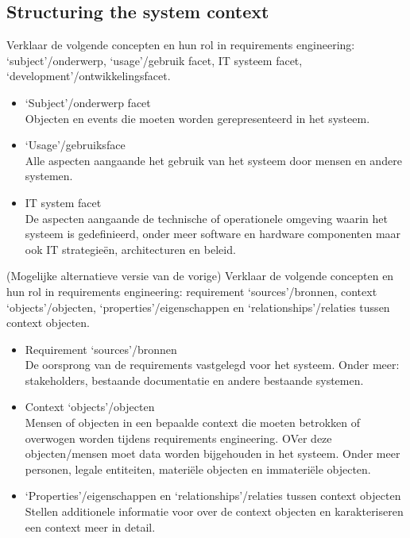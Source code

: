 \documentclass{article}
\begin{document}
\subsection{Structuring the system context}

\begin{quest}{}Verklaar de volgende concepten en hun rol in requirements engineering: `subject'/onderwerp, `usage'/gebruik facet, IT systeem facet, `development'/ontwikkelingsfacet.
\end{quest}

\begin{itemize}
    \item `Subject'/onderwerp facet\\
    Objecten en events die moeten worden gerepresenteerd in het systeem.
    \item `Usage'/gebruiksface\\
    Alle aspecten aangaande het gebruik van het systeem door mensen en andere systemen.
    \item IT system facet\\
    De aspecten aangaande de technische of operationele omgeving waarin het systeem is gedefinieerd, onder meer software en hardware componenten maar ook IT strategie\"en, architecturen en beleid.
\end{itemize}


\begin{quest}{}(Mogelijke alternatieve versie van de vorige) Verklaar de volgende concepten en hun rol in requirements engineering: requirement `sources'/bronnen, context `objects'/objecten, `properties'/eigenschappen en `relationships'/relaties tussen context objecten. 
\end{quest}

\begin{itemize}
    \item Requirement `sources'/bronnen\\
    De oorsprong van de requirements vastgelegd voor het systeem. Onder meer: stakeholders, bestaande documentatie en andere bestaande systemen.
    \item Context `objects'/objecten\\
    Mensen of objecten in een bepaalde context die moeten betrokken of overwogen worden tijdens requirements engineering. OVer deze objecten/mensen moet data worden bijgehouden in het systeem.
    Onder meer personen, legale entiteiten, materi\"ele objecten en immateri\"ele objecten.
    \item `Properties'/eigenschappen en `relationships'/relaties tussen context objecten\\
    Stellen additionele informatie voor over de context objecten en karakteriseren een context meer in detail.
\end{itemize}
\end{document}
